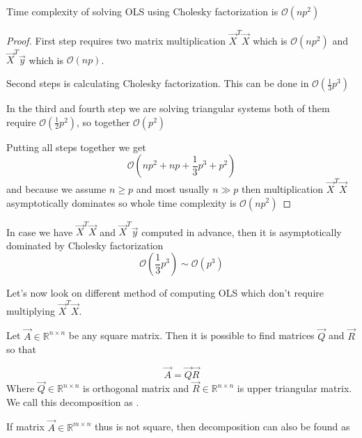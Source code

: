 \begin{observation}
	Time complexity of solving OLS using Cholesky factorization is $\mathcal{O}(np^2)$
\end{observation}
\begin{proof}
	First step requires two matrix multiplication $\vec{X}^T\vec{X}$ which is $\mathcal{O}(np^2)$ and  $\vec{X}^T\vec{y}$ which is $\mathcal{O}(np)$.
	
	Second steps is calculating Cholesky factorization. This can be done in $\mathcal{O}(\frac{1}{3}p^3)$ \cite{krishnamoorthy2013matrix}

	In the third and fourth step we are solving triangular systems both of them require
	 $\mathcal{O}(\frac{1}{2}p^2)$, so together $\mathcal{O}(p^2)$

	Putting all steps together we get  
	\begin{equation} \label{timecholeskywhole}
		\mathcal{O}(np^2 + np + \frac{1}{3}p^3 + p^2)
	\end{equation}
	and because we assume $n \geq p$ and most usually  $n \gg p$ then multiplication $\vec{X}^T\vec{X}$ asymptotically dominates so whole time complexity is $\mathcal{O}(np^2)$
\end{proof}
\begin{note}
	In case we have $\vec{X}^T\vec{X}$ and  $\vec{X}^T\vec{y}$ computed in advance, then it is asymptotically dominated by Cholesky factorization 
	\begin{equation} \label{timecholesky}
		\mathcal{O}(\frac{1}{3}p^3) \sim \mathcal{O}(p^3)
	\end{equation}
\end{note}

Let's now look on different method of computing OLS which don't require multiplying $\vec{X}^T\vec{X}$.

\begin{definition}
	Let $\vec{A} \in \mathbb{R}^{n \times n}$ be any square matrix. Then it is possible to find matrices $\vec{Q}$ and $\vec{R}$ so that 

	\begin{equation}
		\vec{A} = \vec{Q}\vec{R}
	\end{equation}
	Where $\vec{Q} \in \mathbb{R}^{n \times n}$ is orthogonal matrix and $\vec{R} \in \mathbb{R}^{n \times n}$ is upper triangular matrix. 
	We call this decomposition as .
\end{definition}
If matrix $\vec{A} \in \mathbb{R}^{m \times n}$ thus is not square, then decomposition can also be found as

